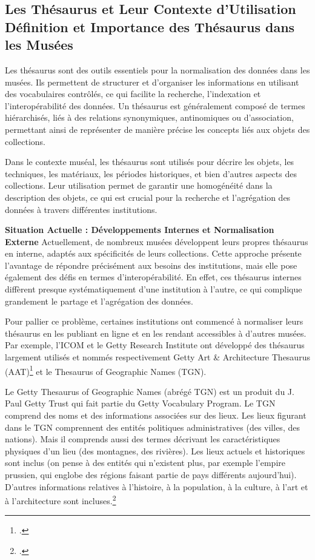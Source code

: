 \subsection{Les Thésaurus et Leur Contexte d'Utilisation
Définition et Importance des Thésaurus dans les Musées}

Les thésaurus sont des outils essentiels pour la normalisation des données dans les musées. Ils permettent de structurer et d'organiser les informations en utilisant des vocabulaires contrôlés, ce qui facilite la recherche, l'indexation et l'interopérabilité des données. Un thésaurus est généralement composé de termes hiérarchisés, liés à des relations synonymiques, antinomiques ou d'association, permettant ainsi de représenter de manière précise les concepts liés aux objets des collections.\newline

Dans le contexte muséal, les thésaurus sont utilisés pour décrire les objets, les techniques, les matériaux, les périodes historiques, et bien d'autres aspects des collections. Leur utilisation permet de garantir une homogénéité dans la description des objets, ce qui est crucial pour la recherche et l'agrégation des données à travers différentes institutions.\newline

\textbf{Situation Actuelle : Développements Internes et Normalisation Externe}
Actuellement, de nombreux musées développent leurs propres thésaurus en interne, adaptés aux spécificités de leurs collections. Cette approche présente l'avantage de répondre précisément aux besoins des institutions, mais elle pose également des défis en termes d'interopérabilité. En effet, ces thésaurus internes diffèrent presque systématiquement d'une institution à l'autre, ce qui complique grandement le partage et l'agrégation des données.\newline

Pour pallier ce problème, certaines institutions ont commencé à normaliser leurs thésaurus en les publiant en ligne et en les rendant accessibles à d'autres musées. Par exemple, l'ICOM et le Getty Research Institute ont développé des thésaurus largement utilisés et nommés respectivement  Getty Art \& Architecture Thesaurus (AAT)\footcite{aat-getty} et le Thesaurus of Geographic Names (TGN). 

Le Getty Thesaurus of Geographic Names (abrégé TGN) est un produit du J. Paul Getty Trust qui fait partie du Getty Vocabulary Program. Le TGN comprend des noms et des informations associées sur des lieux. Les lieux figurant dans le TGN comprennent des entités politiques administratives (des villes, des nations). Mais il comprends aussi des termes décrivant les caractéristiques physiques d'un lieu (des montagnes, des rivières). Les lieux actuels et historiques sont inclus (on pense à des entités qui n'existent plus, par exemple l'empire prussien, qui englobe des régions faisant partie de pays différents aujourd'hui). D'autres informations relatives à l'histoire, à la population, à la culture, à l'art et à l'architecture sont incluses.\footcite{thesaurus_getty_wiki}


